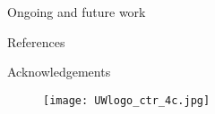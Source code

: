 \documentclass[final]{beamer}
\newlength{\onecolwid}
\begin{document}
\begin{frame}{}
\begin{columns}[t]
\begin{column}{\onecolwid}
\begin{block}{Ongoing and future work}
      \end{block}
      \begin{block}{References}
      \end{block}
      \begin{block}{Acknowledgements}
      \end{block}
      \begin{figure}[!b]
        \texttt{[image: UWlogo\_ctr\_4c.jpg]}
      \end{figure}
    \end{column}
  \end{columns}
\end{frame}
\end{document}
